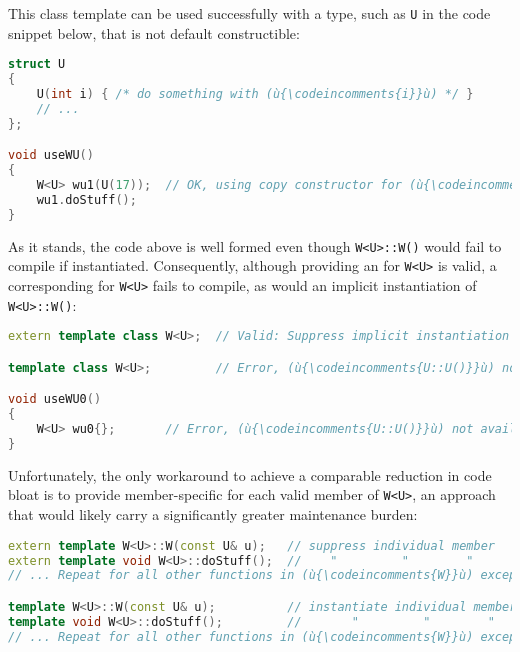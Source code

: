 \noindent This class template can be used successfully with a type, such as
\lstinline!U! in the code snippet below, that is not default constructible:

\begin{lstlisting}[language=C++]
struct U
{
    U(int i) { /* do something with (ù{\codeincomments{i}}ù) */ }
    // ...
};

void useWU()
{
    W<U> wu1(U(17));  // OK, using copy constructor for (ù{\codeincomments{U}}ù)
    wu1.doStuff();
}
\end{lstlisting}
    
\noindent As it stands, the code above is well formed even though
\lstinline!W<U>::W()! would fail to compile if instantiated. Consequently,
although providing an 
for \lstinline!W<U>! is valid, a corresponding
 for \lstinline!W<U>!
fails to compile, as would an implicit instantiation of
\lstinline!W<U>::W()!:

\begin{lstlisting}[language=C++]
extern template class W<U>;  // Valid: Suppress implicit instantiation of (ù{\codeincomments{W<U>}}ù).

template class W<U>;         // Error, (ù{\codeincomments{U::U()}}ù) not available for (ù{\codeincomments{W<U>::W()}}ù)

void useWU0()
{
    W<U> wu0{};       // Error, (ù{\codeincomments{U::U()}}ù) not available for (ù{\codeincomments{W<U>::W()}}ù)
}
\end{lstlisting}
    
\noindent Unfortunately, the only workaround to achieve a comparable reduction in
code bloat is to provide member-specific  for each valid member of \lstinline!W<U>!, an approach
that would likely carry a significantly greater maintenance burden:

\begin{lstlisting}[language=C++]
extern template W<U>::W(const U& u);   // suppress individual member
extern template void W<U>::doStuff();  //    "         "        "
// ... Repeat for all other functions in (ù{\codeincomments{W}}ù) except (ù{\codeincomments{W<U>::W()}}ù).

template W<U>::W(const U& u);          // instantiate individual member
template void W<U>::doStuff();         //       "         "        "
// ... Repeat for all other functions in (ù{\codeincomments{W}}ù) except (ù{\codeincomments{W<U>::W()}}ù).
\end{lstlisting}
    
